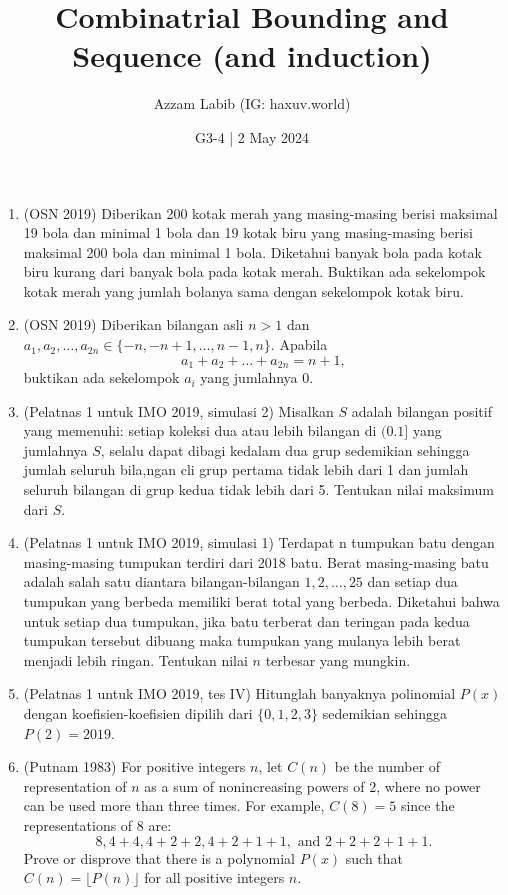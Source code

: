 \documentclass[11pt]{scrartcl}
\title{Combinatrial Bounding and Sequence (and induction)}
\author{Azzam Labib (IG: haxuv.world)}
\date{G3-4 | 2 May 2024}
\begin{document}
\maketitle

\begin{enumerate}
    \item (OSN 2019) Diberikan 200 kotak merah yang masing-masing berisi maksimal 19 bola dan minimal 1 bola dan 19 kotak biru yang masing-masing berisi maksimal 200 bola dan minimal 1 bola. Diketahui banyak bola pada kotak biru kurang dari banyak bola pada kotak merah. Buktikan ada sekelompok kotak merah yang jumlah bolanya sama dengan sekelompok kotak biru.

    \item (OSN 2019) Diberikan bilangan asli $n >1$ dan $a_1,a_2,\ldots,a_{2n} \in \{-n,-n+1, \ldots, n-1,n\}$. Apabila
    $$a_1+a_2+\ldots+a_{2n}=n+1,$$
    buktikan ada sekelompok $a_i$ yang jumlahnya 0.

    \item (Pelatnas 1 untuk IMO 2019, simulasi 2) Misalkan $S$ adalah bilangan positif yang memenuhi: setiap koleksi dua atau lebih bilangan di $(0. 1]$ yang jumlahnya $S$, selalu dapat dibagi kedalam dua grup sedemikian sehingga jumlah seluruh bila,ngan cli grup pertama tidak lebih dari 1 dan jumlah seluruh bilangan di grup kedua tidak lebih dari 5. Tentukan nilai maksimum dari $S$. 

    \item (Pelatnas 1 untuk IMO 2019, simulasi 1) Terdapat n tumpukan batu dengan masing-masing tumpukan terdiri dari 2018 batu. Berat masing-masing batu adalah salah satu diantara bilangan-bilangan $1,2,\ldots,25$ dan setiap dua tumpukan yang berbeda memiliki berat total yang berbeda. Diketahui bahwa untuk setiap dua tumpukan, jika batu terberat dan teringan pada kedua tumpukan tersebut dibuang maka tumpukan yang mulanya lebih berat menjadi lebih ringan. Tentukan nilai $n$ terbesar yang mungkin. 

    \item (Pelatnas 1 untuk IMO 2019, tes IV) Hitunglah banyaknya polinomial $P(x)$ dengan koefisien-koefisien dipilih dari $\{0,1,2,3\}$ sedemikian sehingga $P(2)=2019$.

    \item (Putnam 1983) For positive integers $n$, let $C(n)$ be the number of representation of $n$ as a sum of nonincreasing powers of $2$, where no power can be used more than three times. For example, $C(8)=5$ since the representations of $8$ are:
    $$8,4+4,4+2+2,4+2+1+1,\text{ and }2+2+2+1+1.$$
    Prove or disprove that there is a polynomial $P(x)$ such that $C(n)=\lfloor P(n)\rfloor$ for all positive integers $n$.
\end{enumerate}
\end{document}

